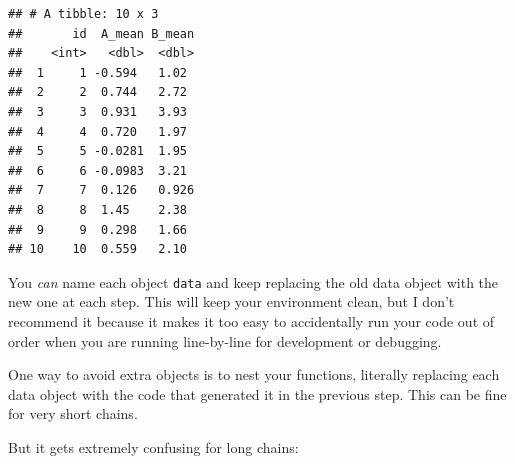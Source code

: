 \documentclass[
  oneside]{book}
\newenvironment{Shaded}{\begin{snugshade}}{\end{snugshade}}
\newcommand{\DecValTok}[1]{\textcolor[rgb]{0.00,0.00,0.81}{#1}}
\newcommand{\FunctionTok}[1]{\textcolor[rgb]{0.00,0.00,0.00}{#1}}
\newcommand{\NormalTok}[1]{#1}
\newcommand{\OtherTok}[1]{\textcolor[rgb]{0.56,0.35,0.01}{#1}}
\newcommand{\SpecialCharTok}[1]{\textcolor[rgb]{0.00,0.00,0.00}{#1}}
\begin{document}
\begin{verbatim}
## # A tibble: 10 x 3
##       id  A_mean B_mean
##    <int>   <dbl>  <dbl>
##  1     1 -0.594   1.02 
##  2     2  0.744   2.72 
##  3     3  0.931   3.93 
##  4     4  0.720   1.97 
##  5     5 -0.0281  1.95 
##  6     6 -0.0983  3.21 
##  7     7  0.126   0.926
##  8     8  1.45    2.38 
##  9     9  0.298   1.66 
## 10    10  0.559   2.10
\end{verbatim}

\begin{warning}
You \emph{can} name each object \texttt{data} and keep replacing the old data object with the new one at each step. This will keep your environment clean, but I don't recommend it because it makes it too easy to accidentally run your code out of order when you are running line-by-line for development or debugging.

\end{warning}

One way to avoid extra objects is to nest your functions, literally replacing each data object with the code that generated it in the previous step. This can be fine for very short chains.

\begin{Shaded}
\end{Shaded}

But it gets extremely confusing for long chains:
\end{document}
